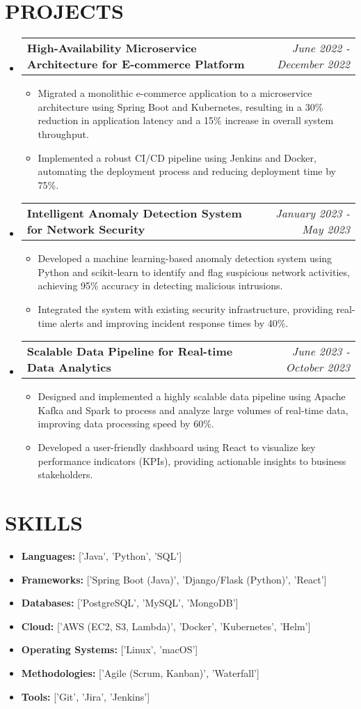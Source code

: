 \documentclass[letterpaper,11pt]{article}
\makeatletter
\newcommand{\resumeItem}[1]{\item\small{{#1 \vspace{-3pt}}}}
\newcommand{\resumeProjectHeading}[2]{\item\begin{tabular*}{0.97\textwidth}{l@{\extracolsep{\fill}}r}\small#1 & #2 \\\end{tabular*}\vspace{-7pt}}
\newcommand{\resumeSubHeadingListStart}{\begin{itemize}[leftmargin=0.15in, label={}]}
\newcommand{\resumeSubHeadingListEnd}{\end{itemize}}
\newcommand{\resumeItemListStart}{\begin{itemize}}
\newcommand{\resumeItemListEnd}{\end{itemize}\vspace{-5pt}}
\makeatother
\begin{document}
\section{{\fontsize{9pt}{20pt}\selectfont \textbf{PROJECTS}}}
\resumeSubHeadingListStart
\resumeProjectHeading{\textbf{High-Availability Microservice Architecture for E-commerce Platform}}{\textit{June 2022 - December 2022}}
\resumeItemListStart
\resumeItem{Migrated a monolithic e-commerce application to a microservice architecture using Spring Boot and Kubernetes, resulting in a 30\% reduction in application latency and a 15\% increase in overall system throughput.}
\resumeItem{Implemented a robust CI/CD pipeline using Jenkins and Docker, automating the deployment process and reducing deployment time by 75\%.}
\resumeItemListEnd\vspace{-6pt}
\resumeProjectHeading{\textbf{Intelligent Anomaly Detection System for Network Security}}{\textit{January 2023 - May 2023}}
\resumeItemListStart
\resumeItem{Developed a machine learning-based anomaly detection system using Python and scikit-learn to identify and flag suspicious network activities, achieving 95\% accuracy in detecting malicious intrusions.}
\resumeItem{Integrated the system with existing security infrastructure, providing real-time alerts and improving incident response times by 40\%.}
\resumeItemListEnd\vspace{-6pt}
\resumeProjectHeading{\textbf{Scalable Data Pipeline for Real-time Data Analytics}}{\textit{June 2023 - October 2023}}
\resumeItemListStart
\resumeItem{Designed and implemented a highly scalable data pipeline using Apache Kafka and Spark to process and analyze large volumes of real-time data, improving data processing speed by 60\%.}
\resumeItem{Developed a user-friendly dashboard using React to visualize key performance indicators (KPIs), providing actionable insights to business stakeholders.}
\resumeItemListEnd
\resumeSubHeadingListEnd\vspace{-15pt}
\section{{\fontsize{9pt}{20pt}\selectfont \textbf{SKILLS}}}
\resumeSubHeadingListStart
\resumeItem{\textbf{Languages:} ['Java', 'Python', 'SQL']}\vspace{-7pt}
\resumeItem{\textbf{Frameworks:} ['Spring Boot (Java)', 'Django/Flask (Python)', 'React']}\vspace{-7pt}
\resumeItem{\textbf{Databases:} ['PostgreSQL', 'MySQL', 'MongoDB']}\vspace{-7pt}
\resumeItem{\textbf{Cloud:} ['AWS (EC2, S3, Lambda)', 'Docker', 'Kubernetes', 'Helm']}\vspace{-7pt}
\resumeItem{\textbf{Operating Systems:} ['Linux', 'macOS']}\vspace{-7pt}
\resumeItem{\textbf{Methodologies:} ['Agile (Scrum, Kanban)', 'Waterfall']}\vspace{-7pt}
\resumeItem{\textbf{Tools:} ['Git', 'Jira', 'Jenkins']}
\resumeSubHeadingListEnd\vspace{-15pt}
\end{document}
